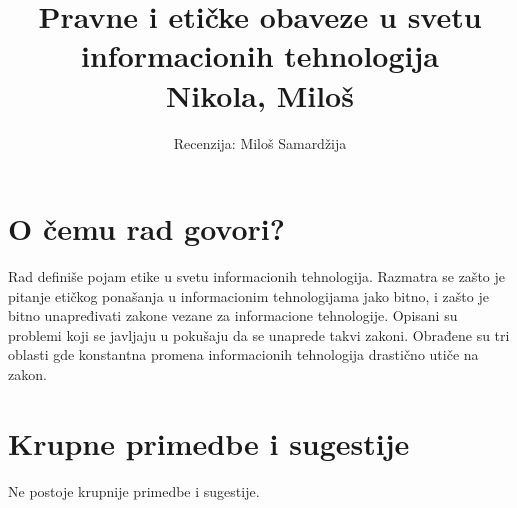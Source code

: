 \documentclass[a4paper]{article}
\begin{document}
\title{Pravne i etičke obaveze u svetu informacionih tehnologija\\ \small{Nikola, Miloš}}

\author{Recenzija: Miloš Samardžija}


\maketitle




\section{O čemu rad govori?}
Rad definiše pojam etike u svetu informacionih tehnologija. Razmatra se zašto je pitanje etičkog ponašanja u informacionim tehnologijama jako bitno, i zašto je bitno unapređivati zakone vezane za informacione tehnologije. Opisani su problemi koji se javljaju u pokušaju da se unaprede takvi zakoni. Obrađene su tri oblasti gde konstantna promena informacionih tehnologija drastično utiče na zakon.

\section{Krupne primedbe i sugestije}
Ne postoje krupnije primedbe i sugestije.
\end{document}
